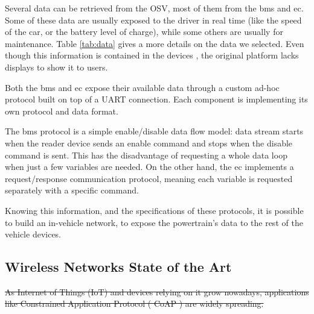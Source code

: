 \documentclass[runningheads]{llncs}
\begin{document}
Several data   can be retrieved 
from the OSV, most of them  
from the \gls{bms} and \gls{ec}. Some of these data are usually exposed to the 
driver in real time (like the speed of the car, or the battery level of 
charge), while some others are usually for maintenance.
Table \ref{tab:data} gives a more details on the data we selected.
Even though this information is contained in the devices , the original platform 
lacks displays to show it to users.

Both the \gls{bms} and \gls{ec} expose their available data through a custom 
ad-hoc protocol built on top of a UART connection. Each component is implementing 
its own protocol and data format.

The \gls{bms} protocol is a simple enable/disable data flow model: data stream 
starts when the reader device sends an enable command and stops when the 
disable command is sent. This has the disadvantage of requesting a whole data 
loop when just a few variables are needed.
On the other hand, the \gls{ec} implements a request/response communication 
protocol, meaning each variable is requested separately with a specific command.

Knowing this information, and the specifications of these protocols, it is
possible to build an in-vehicle network, to expose the powertrain's data to 
the rest of the vehicle devices.

\subsection{Wireless Networks State of the Art}


\sout{As Internet of Things (IoT) and devices relying on it grow nowadays,
applications like Constrained Application Protocol ( CoAP ) are widely
spreading.}
\end{document}
